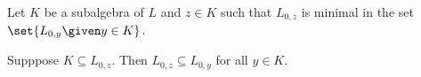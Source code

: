 Let $K$ be a subalgebra of $L$ and $z \in K$ such that $L_{0, z}$ is minimal
in the set $\set{L_{0, y}\given y \in K}$.

Supppose $K \subseteq L_{0, z}$. Then $L_{0, z} \subseteq L_{0, y}$ for all
$y \in K$.
